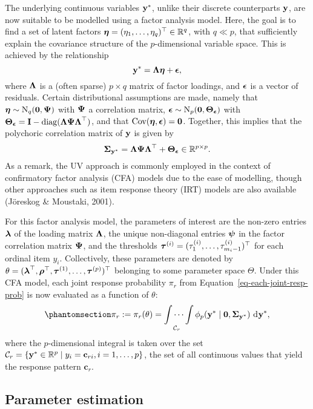 \documentclass[
  letterpaper,
  DIV=11,
  numbers=noendperiod]{scrartcl}
\begin{document}
The underlying continuous variables \({\mathbf y}^*\), unlike their discrete
counterparts \({\mathbf y}\), are now suitable to be modelled using a factor
analysis model. Here, the goal is to find a set of latent factors
\({\boldsymbol\eta} = (\eta_1,\dots,\eta_q)^\top \in \mathbb{R}^q\), with \(q \ll p\),
that sufficiently explain the covariance structure of the
\(p\)-dimensional variable space. This is achieved by the relationship
\[
{\mathbf y}^* = {\boldsymbol\Lambda} {\boldsymbol\eta} + {\boldsymbol\epsilon},
\] where \({\boldsymbol\Lambda}\) is a (often sparse) \(p \times q\) matrix of
factor loadings, and \({\boldsymbol\epsilon}\) is a vector of residuals. Certain
distributional assumptions are made, namely that
\({\boldsymbol\eta} \sim \operatorname{N}_q({\mathbf 0},{\boldsymbol\Psi})\) with \({\boldsymbol\Psi}\) a correlation matrix,
\({\boldsymbol\epsilon} \sim \operatorname{N}_p({\mathbf 0},{\boldsymbol\Theta}_{{\boldsymbol\epsilon}})\) with
\({\boldsymbol\Theta}_{{\boldsymbol\epsilon}} = {\mathbf I} - \operatorname{diag}({\boldsymbol\Lambda} {\boldsymbol\Psi} {\boldsymbol\Lambda}^\top)\), and
that \(\operatorname{Cov}({\boldsymbol\eta},{\boldsymbol\epsilon}) = {\mathbf 0}\). Together, this implies that
the polychoric correlation matrix of \({\mathbf y}\) is given by \[
{\boldsymbol\Sigma}_{{\mathbf y}^*} = {\boldsymbol\Lambda} {\boldsymbol\Psi} {\boldsymbol\Lambda}^\top + {\boldsymbol\Theta}_{{\boldsymbol\epsilon}} \in \mathbb{R}^{p\times p}.
\] As a remark, the UV approach is commonly employed in the context of
confirmatory factor analysis (CFA) models due to the ease of modelling,
though other approaches such as item response theory (IRT) models are
also available (Jöreskog \& Moustaki, 2001).

For this factor analysis model, the parameters of interest are the
non-zero entries \({\boldsymbol\lambda}\) of the loading matrix \({\boldsymbol\Lambda}\), the
unique non-diagonal entries \({\boldsymbol\psi}\) in the factor correlation matrix
\({\boldsymbol\Psi}\), and the thresholds
\({\boldsymbol\tau}^{(i)} = (\tau_1^{(i)},\dots,\tau_{m_i-1}^{(i)})^\top\) for each
ordinal item \(y_i\). Collectively, these parameters are denoted by
\(\theta = ({\boldsymbol\lambda}^\top,{\boldsymbol\rho}^\top,{\boldsymbol\tau}^{(1)},\dots,{\boldsymbol\tau}^{(p)})^\top\)
belonging to some parameter space \(\Theta\). Under this CFA model, each
joint response probability \(\pi_r\) from
Equation~\ref{eq-each-joint-resp-prob} is now evaluated as a function of
\(\theta\):
\begin{equation}\phantomsection\label{eq-joint-resp-prob-integral}{
\pi_r := \pi_r(\theta) = \idotsint \limits_{\mathcal C_r} \phi_p(\by^* \mid \bzero,\bSigma_{\by^*}) \, \dint\by^*,
}\end{equation} where the \(p\)-dimensional integral is taken over the
set
\(\mathcal C_r = \{ {\mathbf y}^* \in \mathbb{R}^p \mid y_i = \mathbf c_{ri}, i=1,\dots,p\}\),
the set of all continuous values that yield the response pattern
\(\mathbf c_r\).

\subsection{Parameter estimation}\label{parameter-estimation}
\end{document}
